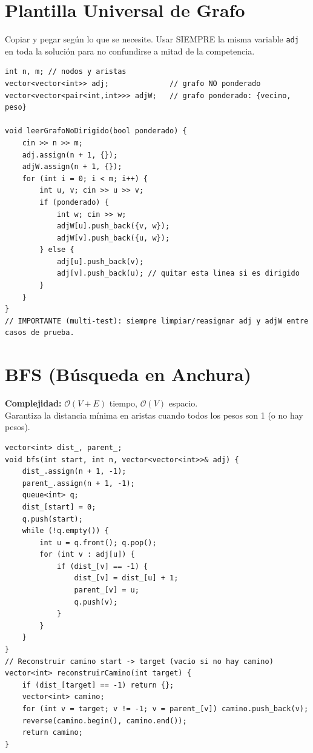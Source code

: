 \documentclass[10pt,twocolumn,letterpaper]{report}
\begin{document}
\section{Plantilla Universal de Grafo}
Copiar y pegar según lo que se necesite. Usar SIEMPRE la misma variable \texttt{adj} en toda la solución para no confundirse a mitad de la competencia.
\begin{lstlisting}
int n, m; // nodos y aristas
vector<vector<int>> adj;              // grafo NO ponderado
vector<vector<pair<int,int>>> adjW;   // grafo ponderado: {vecino, peso}

void leerGrafoNoDirigido(bool ponderado) {
    cin >> n >> m;
    adj.assign(n + 1, {});
    adjW.assign(n + 1, {});
    for (int i = 0; i < m; i++) {
        int u, v; cin >> u >> v;
        if (ponderado) {
            int w; cin >> w;
            adjW[u].push_back({v, w});
            adjW[v].push_back({u, w});
        } else {
            adj[u].push_back(v);
            adj[v].push_back(u); // quitar esta linea si es dirigido
        }
    }
}
// IMPORTANTE (multi-test): siempre limpiar/reasignar adj y adjW entre casos de prueba.
\end{lstlisting}

\section{BFS (Búsqueda en Anchura)}
\textbf{Complejidad:} $\mathcal{O}(V + E)$ tiempo, $\mathcal{O}(V)$ espacio. \\
Garantiza la distancia mínima en aristas cuando todos los pesos son 1 (o no hay pesos).
\begin{lstlisting}
vector<int> dist_, parent_;
void bfs(int start, int n, vector<vector<int>>& adj) {
    dist_.assign(n + 1, -1);
    parent_.assign(n + 1, -1);
    queue<int> q;
    dist_[start] = 0;
    q.push(start);
    while (!q.empty()) {
        int u = q.front(); q.pop();
        for (int v : adj[u]) {
            if (dist_[v] == -1) {
                dist_[v] = dist_[u] + 1;
                parent_[v] = u;
                q.push(v);
            }
        }
    }
}
// Reconstruir camino start -> target (vacio si no hay camino)
vector<int> reconstruirCamino(int target) {
    if (dist_[target] == -1) return {};
    vector<int> camino;
    for (int v = target; v != -1; v = parent_[v]) camino.push_back(v);
    reverse(camino.begin(), camino.end());
    return camino;
}
\end{lstlisting}
\end{document}

